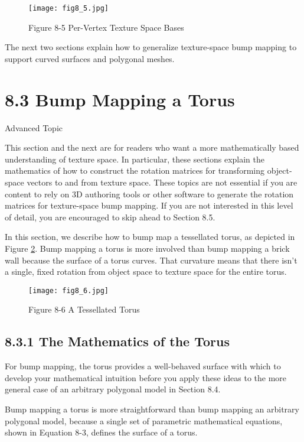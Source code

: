 \documentclass[../main.tex]{subfiles}
\begin{document}
\begin{figure}
    \centering
    \texttt{[image: fig8\_5.jpg]}
    \caption{Figure 8-5 Per-Vertex Texture Space Bases}
    \label{fig:8-5}
\end{figure}

The next two sections explain how to generalize texture-space bump mapping to support curved surfaces and polygonal meshes.

\section{8.3 Bump Mapping a Torus}

\begin{framed}
Advanced Topic

This section and the next are for readers who want a more mathematically based understanding of texture space. In particular, these sections explain the mathematics of how to construct the rotation matrices for transforming object-space vectors to and from texture space. These topics are not essential if you are content to rely on 3D authoring tools or other software to generate the rotation matrices for texture-space bump mapping. If you are not interested in this level of detail, you are encouraged to skip ahead to Section 8.5.
\end{framed}

In this section, we describe how to bump map a tessellated torus, as depicted in Figure \ref{fig:8-6}. Bump mapping a torus is more involved than bump mapping a brick wall because the surface of a torus curves. That curvature means that there isn't a single, fixed rotation from object space to texture space for the entire torus.

\begin{figure}
    \centering
    \texttt{[image: fig8\_6.jpg]}
    \caption{Figure 8-6 A Tessellated Torus}
    \label{fig:8-6}
\end{figure}

\subsection{8.3.1 The Mathematics of the Torus}

For bump mapping, the torus provides a well-behaved surface with which to develop your mathematical intuition before you apply these ideas to the more general case of an arbitrary polygonal model in Section 8.4.

Bump mapping a torus is more straightforward than bump mapping an arbitrary polygonal model, because a single set of parametric mathematical equations, shown in Equation 8-3, defines the surface of a torus.
\end{document}
